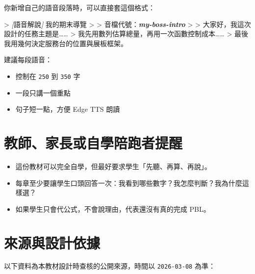 \documentclass[
  chinese,
  12pt,
  a4paper,
  oneside]{article}
\newenvironment{Shaded}{}{}
\newcommand{\AttributeTok}[1]{\textcolor[rgb]{0.49,0.56,0.16}{#1}}
\newcommand{\CommentTok}[1]{\textcolor[rgb]{0.38,0.63,0.69}{\textit{#1}}}
\newcommand{\InformationTok}[1]{\textcolor[rgb]{0.38,0.63,0.69}{\textbf{\textit{#1}}}}
\newcommand{\OtherTok}[1]{\textcolor[rgb]{0.00,0.44,0.13}{#1}}
\providecommand{\tightlist}{%
  \setlength{\itemsep}{0pt}\setlength{\parskip}{0pt}}
\begin{document}
你新增自己的語音段落時，可以直接套這個格式：

\begin{Shaded}
\begin{Highlighting}[]

\AttributeTok{\textgreater{} }\CommentTok{[}\OtherTok{語音解說}\CommentTok{]}\AttributeTok{ 我的期末導覽}
\AttributeTok{\textgreater{}}
\AttributeTok{\textgreater{} 音檔代號：}\InformationTok{\textasciigrave{}my{-}boss{-}intro\textasciigrave{}}
\AttributeTok{\textgreater{}}
\AttributeTok{\textgreater{} 大家好，我這次設計的任務主題是……}
\AttributeTok{\textgreater{} 我先用數列估算總量，再用一次函數控制成本……}
\AttributeTok{\textgreater{} 最後我用幾何決定服務台的位置與展板框架。}
\end{Highlighting}
\end{Shaded}

建議每段語音：

\begin{itemize}
\tightlist
\item
  控制在 \texttt{250} 到 \texttt{350} 字
\item
  一段只講一個重點
\item
  句子短一點，方便 Edge TTS 朗讀
\end{itemize}

\newpage

\section{教師、家長或自學陪跑者提醒}\label{ux6559ux5e2bux5bb6ux9577ux6216ux81eaux5b78ux966aux8dd1ux8005ux63d0ux9192}

\begin{itemize}
\tightlist
\item
  這份教材可以完全自學，但最好要求學生「先聽、再算、再說」。
\item
  每章至少要讓學生口頭回答一次：我看到哪些數字？我怎麼判斷？我為什麼這樣選？
\item
  如果學生只會代公式，不會說理由，代表還沒有真的完成 PBL。
\end{itemize}

\newpage

\section{來源與設計依據}\label{ux4f86ux6e90ux8207ux8a2dux8a08ux4f9dux64da}

以下資料為本教材設計時查核的公開來源，時間以 \texttt{2026-03-08} 為準：
\end{document}
